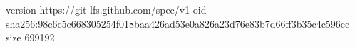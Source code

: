 version https://git-lfs.github.com/spec/v1
oid sha256:98c6c5c668305254f018baa426ad53e0a826a23d76e83b7d66ff3b35c4c596cc
size 699192
